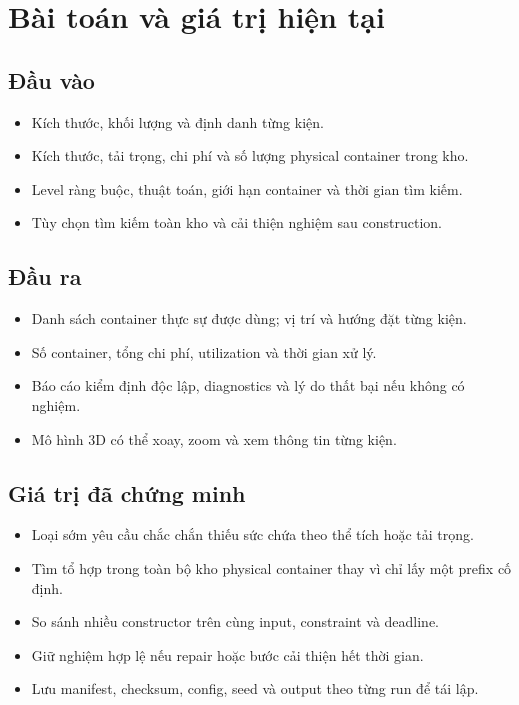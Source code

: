 \documentclass[12pt,a4paper]{article}
\begin{document}
\section{Bài toán và giá trị hiện tại}

\subsection{Đầu vào}
\begin{itemize}[leftmargin=1.5em]
  \item Kích thước, khối lượng và định danh từng kiện.
  \item Kích thước, tải trọng, chi phí và số lượng physical container trong kho.
  \item Level ràng buộc, thuật toán, giới hạn container và thời gian tìm kiếm.
  \item Tùy chọn tìm kiếm toàn kho và cải thiện nghiệm sau construction.
\end{itemize}

\subsection{Đầu ra}
\begin{itemize}[leftmargin=1.5em]
  \item Danh sách container thực sự được dùng; vị trí và hướng đặt từng kiện.
  \item Số container, tổng chi phí, utilization và thời gian xử lý.
  \item Báo cáo kiểm định độc lập, diagnostics và lý do thất bại nếu không có nghiệm.
  \item Mô hình 3D có thể xoay, zoom và xem thông tin từng kiện.
\end{itemize}

\subsection{Giá trị đã chứng minh}
\begin{itemize}[leftmargin=1.5em]
  \item Loại sớm yêu cầu chắc chắn thiếu sức chứa theo thể tích hoặc tải trọng.
  \item Tìm tổ hợp trong toàn bộ kho physical container thay vì chỉ lấy một prefix cố định.
  \item So sánh nhiều constructor trên cùng input, constraint và deadline.
  \item Giữ nghiệm hợp lệ nếu repair hoặc bước cải thiện hết thời gian.
  \item Lưu manifest, checksum, config, seed và output theo từng run để tái lập.
\end{itemize}
\end{document}
